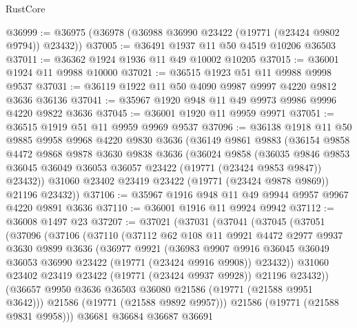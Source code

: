\begin{lexlean}{RustCore}
\begin{coremodule}
@36999 := @36975 (@36978 (@36988 @36990 @23422 (@19771 (@23424 @9802 @9794)) @23432))
@37005 := @36491 @1937 @11 @50 @4519 @10206 @36503
@37011 := @36362 @1924 @1936 @11 @49 @10002 @10205
@37015 := @36001 @1924 @11 @9988 @10000
@37021 := @36515 @1923 @51 @11 @9988 @9998 @9537
@37031 := @36119 @1922 @11 @50 @4090 @9987 @9997 @4220 @9812 @3636 @36136
@37041 := @35967 @1920 @948 @11 @49 @9973 @9986 @9996 @4220 @9822 @3636
@37045 := @36001 @1920 @11 @9959 @9971
@37051 := @36515 @1919 @51 @11 @9959 @9969 @9537
@37096 := @36138
    @1918
    @11
    @50
    @9885
    @9958
    @9968
    @4220
    @9830
    @3636
    (@36149
      @9861
      @9883
      (@36154
        @9858
        @4472
        @9868
        @9878
        @3630
        @9838
        @3636
        (@36024
          @9858
          (@36035
            @9846
            @9853
            @36045
            @36049
            @36053
            @36057
            @23422
            (@19771 (@23424 @9853 @9847))
            @23432))
        @31060
        @23402
        @23419
        @23422
        (@19771 (@23424 @9878 @9869))
        @21196
        @23432))
@37106 := @35967 @1916 @948 @11 @49 @9944 @9957 @9967 @4220 @9891 @3636
@37110 := @36001 @1916 @11 @9924 @9942
@37112 := @36008 @1497 @23
@37207 := @37021
    (@37031
      (@37041
        (@37045
          (@37051
            (@37096
              (@37106
                (@37110
                  (@37112
                    @62
                    @108
                    @11
                    @9921
                    @4472
                    @2977
                    @9937
                    @3630
                    @9899
                    @3636
                    (@36977
                      @9921
                      (@36983
                        @9907
                        @9916
                        @36045
                        @36049
                        @36053
                        @36990
                        @23422
                        (@19771 (@23424 @9916 @9908))
                        @23432))
                    @31060
                    @23402
                    @23419
                    @23422
                    (@19771 (@23424 @9937 @9928))
                    @21196
                    @23432))
                (@36657 @9950 @3636 @36503 @36080 @21586 (@19771 (@21588 @9951 @3642)))
                @21586
                (@19771 (@21588 @9892 @9957)))
              @21586
              (@19771 (@21588 @9831 @9958)))
            @36681
            @36684
            @36687
            @36691

\end{coremodule}
\end{lexlean}
